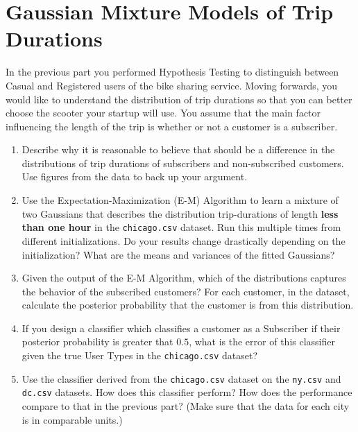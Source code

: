 \documentclass[12pt, answers, addpoints]{exam}
\begin{document}
\section{Gaussian Mixture Models of Trip Durations}

In the previous part you performed Hypothesis Testing to distinguish between Casual and Registered users of the bike sharing service. Moving forwards, you would like to understand the distribution of trip durations so that you can better choose the scooter your startup will use. You assume that the main factor influencing the length of the trip is whether or not a customer is a subscriber. 

\begin{enumerate}
\item Describe why it is reasonable to believe that should be a difference in the distributions of trip durations of subscribers and non-subscribed customers. Use figures from the data to back up your argument.\\

\item Use the Expectation-Maximization (E-M) Algorithm to learn a mixture of two Gaussians that describes the distribution trip-durations of length \textbf{less than one hour} in the \texttt{chicago.csv} dataset. Run this multiple times from different initializations. Do your results change drastically depending on the initialization? What are the means and variances of the fitted Gaussians? \\

\item Given the output of the E-M Algorithm, which of the distributions captures the behavior of the subscribed customers? For each customer, in the dataset, calculate the posterior probability that the customer is from this distribution. \\

\item If you design a classifier which classifies a customer as a Subscriber if their posterior probability is greater that $0.5$, what is the error of this classifier given the true User Types in the  \texttt{chicago.csv} dataset?\\

\item Use the classifier derived from the \texttt{chicago.csv} dataset on the \texttt{ny.csv} and \texttt{dc.csv} datasets. How does this classifier perform? How does the performance compare to that in the previous part? (Make sure that the data for each city is in comparable units.)
\end{enumerate}
\end{document}
